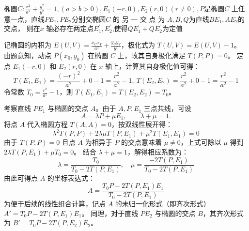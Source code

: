 \begin{exercise}
椭圆$C:\frac{x^2}{a^2}+\frac{y^2}{b^2}=1,(a>b>0),E_1(-r,0),E_2(r,0)(r\neq0),P$是椭圆$C$ 上任意一点，直线$PE_1,PE_2$分别交椭圆$C$ 的 另 一 交 点 为 $A, B, Q$为直线$BE_1,AE_2$的交点， 则在$x$ 轴必存在两定点$E_1^{\prime},E_2^{\prime}$,使得$QE_1^{\prime}+QE_2^{\prime}$为定值
\end{exercise}
\begin{solution}
记椭圆的内积为 $E(U,V) = \frac{x_U x_V}{a^2} + \frac{y_U y_V}{b^2}$，极化式为 $T(U,V) = E(U,V) - 1$。
由题意知，动点 $P(x_0, y_0)$ 在椭圆 $C$ 上，故其自身极化满足 $T(P,P) = 0$。
定点 $E_1(-r, 0)$ 和 $E_2(r, 0)$ 在 $x$ 轴上，计算其自身极化值可得：
$$T(E_1, E_1) = \frac{(-r)^2}{a^2} + 0 - 1 = \frac{r^2}{a^2} - 1,~T(E_2, E_2) = \frac{r^2}{a^2} + 0 - 1 = \frac{r^2}{a^2} - 1$$
令常数 $T_0 = \frac{r^2}{a^2} - 1$，则 $T(E_1, E_1) = T(E_2, E_2) = T_0$。

考察直线 $PE_1$ 与椭圆的交点 $A$。由于 $A, P, E_1$ 三点共线，可设
$$A = \lambda P + \mu E_1,\qquad \lambda + \mu = 1.$$
将点 $A$ 代入椭圆方程 $T(A,A) = 0$，按双线性展开得：
$$\lambda^2 T(P,P) + 2\lambda\mu T(P,E_1) + \mu^2 T(E_1,E_1) = 0$$
由于 $T(P,P) = 0$ 且点 $A$ 为相异于 $P$ 的交点意味着 $\mu \neq 0$，上式可除以 $\mu$ 得到 $2\lambda T(P,E_1) + \mu T_0 = 0$。
结合 $\lambda + \mu = 1$，解得相应系数为：
$$\lambda = \frac{T_0}{T_0 - 2T(P,E_1)}, \quad \mu = \frac{-2T(P,E_1)}{T_0 - 2T(P,E_1)}$$
由此可得点 $A$ 的坐标表达式：
$$A = \frac{T_0 P - 2T(P,E_1) E_1}{T_0 - 2T(P,E_1)}$$
为便于后续的线性组合计算，记点 $A$ 的未归一化形式（即齐次形式） $A' = T_0 P - 2T(P,E_1) E_1$。
同理，对于直线 $PE_2$ 与椭圆的交点 $B$，其齐次形式为 $B' = T_0 P - 2T(P,E_2) E_2$。


\end{solution}

